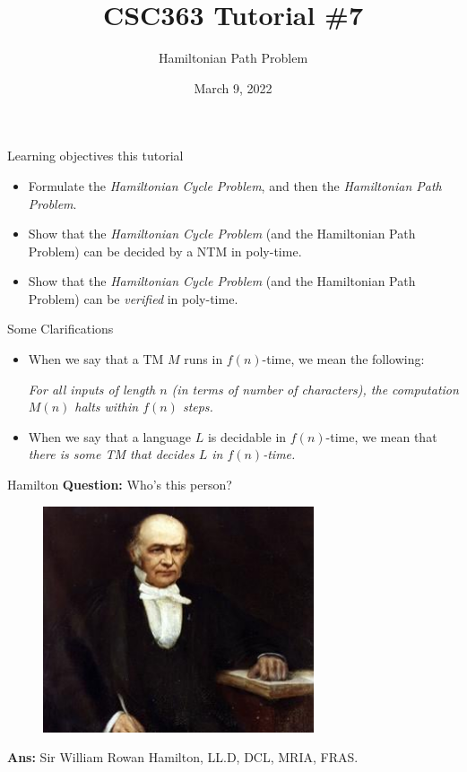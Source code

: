 \documentclass{beamer}
\title{CSC363 Tutorial \#7}
\subtitle{Hamiltonian Path Problem}
\date{March 9, 2022}
\institute{}
\begin{document}
\maketitle

\begin{frame}{Learning objectives this tutorial}
\begin{itemize}
\item Formulate the \textit{Hamiltonian Cycle Problem}, and then the \textit{Hamiltonian Path Problem}.
\item Show that the \textit{Hamiltonian Cycle Problem} (and the Hamiltonian Path Problem) can be decided by a NTM in poly-time.
\item Show that the \textit{Hamiltonian Cycle Problem} (and the Hamiltonian Path Problem) can be \textit{verified} in poly-time.
\end{itemize}
\end{frame}

\begin{frame}{Some Clarifications}
\begin{itemize}
\item When we say that a TM $M$ runs in $f(n)$-time, we mean the following:

\textit{For all inputs of length $n$ (in terms of number of characters), the computation $M(n)$ halts within $f(n)$ steps.}

\item When we say that a language $L$ is decidable in $f(n)$-time, we mean that \textit{there is some TM that decides $L$ in $f(n)$-time.}
\end{itemize}
\end{frame}

\begin{frame}{Hamilton}
\textbf{Question:} Who's this person?

\begin{figure}[h]
    \centering
    \includegraphics[width=8cm]{img/hamilton.jpg}
\end{figure}

\pause

\textbf{Ans:} Sir William Rowan Hamilton, LL.D, DCL, MRIA, FRAS.

\end{frame}
\end{document}
